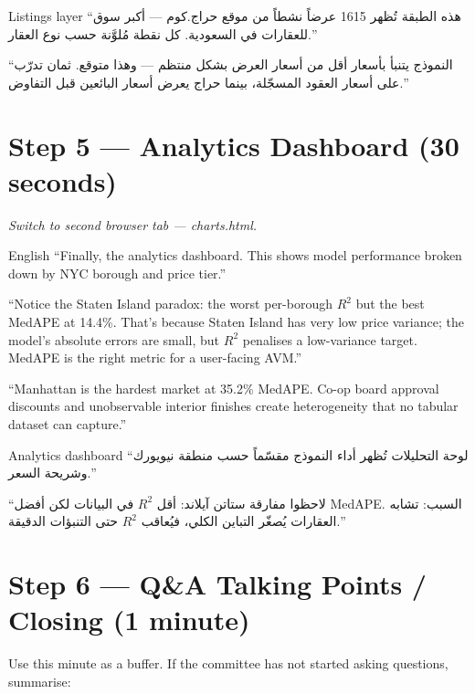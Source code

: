 \documentclass[11pt, a4paper, twoside]{article}
\begin{document}
\begin{arabic}{Listings layer}
``هذه الطبقة تُظهر 1615 عرضاً نشطاً من موقع حراج.كوم --- أكبر سوق للعقارات في
السعودية. كل نقطة مُلوَّنة حسب نوع العقار.''

``النموذج يتنبأ بأسعار أقل من أسعار العرض بشكل منتظم --- وهذا متوقع. ثمان
تدرّب على أسعار العقود المسجّلة، بينما حراج يعرض أسعار البائعين قبل
التفاوض.''
\end{arabic}

\section{Step 5 --- Analytics Dashboard (30 seconds)}
\label{sec:analytics}

\noindent\textit{Switch to second browser tab --- charts.html.}

\begin{narration}{English}
``Finally, the analytics dashboard. This shows model performance broken down by
NYC borough and price tier.''

``Notice the Staten Island paradox: the worst per-borough $R^2$ but the best
MedAPE at 14.4\%. That's because Staten Island has very low price
variance; the model's absolute errors are small, but $R^2$ penalises a
low-variance target. MedAPE is the right metric for a user-facing AVM.''

``Manhattan is the hardest market at 35.2\% MedAPE. Co-op board approval
discounts and unobservable interior finishes create heterogeneity that no
tabular dataset can capture.''
\end{narration}

\begin{arabic}{Analytics dashboard}
``لوحة التحليلات تُظهر أداء النموذج مقسّماً حسب منطقة نيويورك وشريحة السعر.''

``لاحظوا مفارقة ستاتن آيلاند: أقل $R^2$ في البيانات لكن أفضل MedAPE. السبب:
تشابه العقارات يُصغّر التباين الكلي، فيُعاقب $R^2$ حتى التنبؤات الدقيقة.''
\end{arabic}

\section{Step 6 --- Q\&A Talking Points / Closing (1 minute)}
\label{sec:closing}

\noindent Use this minute as a buffer. If the committee has not started asking
questions, summarise:
\end{document}
